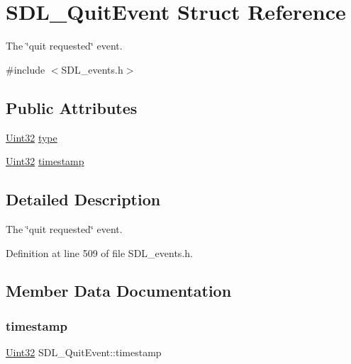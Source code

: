 \hypertarget{struct_s_d_l___quit_event}{}\section{S\+D\+L\+\_\+\+Quit\+Event Struct Reference}
\label{struct_s_d_l___quit_event}


The \char`\"{}quit requested\char`\"{} event.  




{\ttfamily \#include $<$S\+D\+L\+\_\+events.\+h$>$}

\subsection*{Public Attributes}
\begin{DoxyCompactItemize}
\item 
\mbox{\hyperlink{_s_d_l__stdinc_8h_add440eff171ea5f55cb00c4a9ab8672d}{Uint32}} \mbox{\hyperlink{struct_s_d_l___quit_event_a51ab0279e6de40249ba93971a8757cf0}{type}}
\item 
\mbox{\hyperlink{_s_d_l__stdinc_8h_add440eff171ea5f55cb00c4a9ab8672d}{Uint32}} \mbox{\hyperlink{struct_s_d_l___quit_event_a7acd4fa42ca96da8edac146baaa0b433}{timestamp}}
\end{DoxyCompactItemize}


\subsection{Detailed Description}
The \char`\"{}quit requested\char`\"{} event. 

Definition at line 509 of file S\+D\+L\+\_\+events.\+h.



\subsection{Member Data Documentation}
\mbox{\label{struct_s_d_l___quit_event_a7acd4fa42ca96da8edac146baaa0b433}} 
\subsubsection{\texorpdfstring{timestamp}{timestamp}}
{\footnotesize\ttfamily \mbox{\hyperlink{_s_d_l__stdinc_8h_add440eff171ea5f55cb00c4a9ab8672d}{Uint32}} S\+D\+L\+\_\+\+Quit\+Event\+::timestamp}

